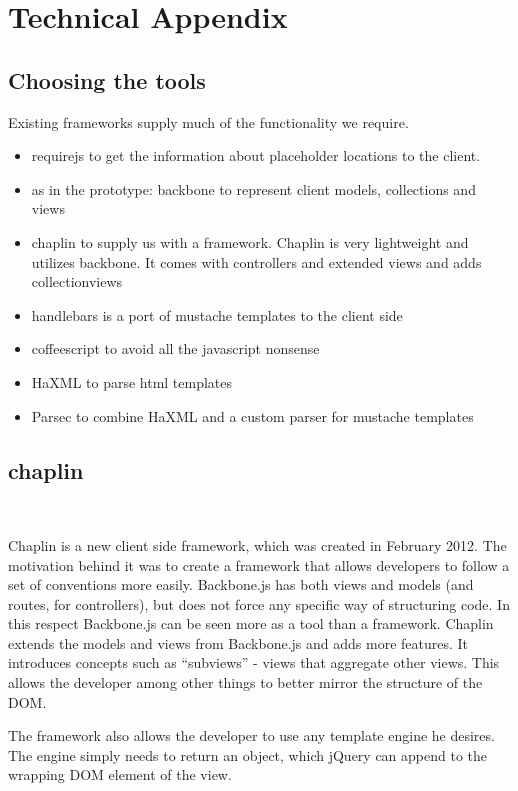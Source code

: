 \documentclass[thesis.tex]{subfiles}
\begin{document}
\appendix
\chapter{Technical Appendix}
\section{Choosing the tools}
Existing frameworks supply much of the functionality we require.
\begin{itemize}
\item requirejs to get the information about placeholder locations to the client.
\item as in the prototype: backbone to represent client models,
	collections and views
\item chaplin to supply us with a framework. Chaplin is very lightweight and
	utilizes backbone. It comes with controllers and extended views and adds
	collectionviews
\item handlebars is a port of mustache templates to the client side
\item coffeescript to avoid all the javascript nonsense
\item HaXML to parse html templates
\item Parsec to combine HaXML and a custom parser for mustache templates
\end{itemize}




\section{chaplin}

\

Chaplin is a new client side framework, which was created in February 2012.
The motivation behind it was to create a framework that allows developers to
follow a set of conventions more easily. Backbone.js has both views and models
(and routes, for controllers), but does not force any specific way of
structuring code. In this respect Backbone.js can be seen more as a tool than a
framework.
Chaplin extends the models and views from Backbone.js and adds more features.
It introduces concepts such as ``subviews'' - views that aggregate other views.
This allows the developer among other things to better mirror the structure of
the DOM.

The framework also allows the developer to use any template engine he desires.
The engine simply needs to return an object, which jQuery can append to the
wrapping DOM element of the view.
\end{document}
